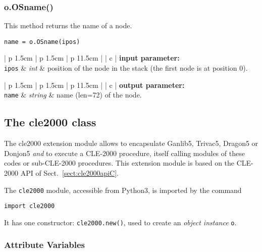 \vskip 0.8cm

\subsubsection{o.OSname()}

This method returns the name of a node.

\begin{verbatim}
name = o.OSname(ipos)
\end{verbatim}

\noindent
\begin{tabular} {| p {1.5cm} | p {1.5cm} | p {11.5cm} |}
\hline
{} {| c |} {\bf input parameter:} \\
\hline
{\tt ipos} & {\it int}  & position of the node in the stack (the first node is at position 0). \\
\hline
\end{tabular}

\vskip 0.8cm

\noindent
\begin{tabular} {| p {1.5cm} | p {1.5cm} | p {11.5cm} |}
\hline
{} {| c |} {\bf output parameter:} \\
\hline
{\tt name} & {\it string} & name (len=72) of the node.\\
\hline
\end{tabular}

\vskip 0.8cm

\subsection{The cle2000 class}

The  {\sc cle2000} extension module allows to encapsulate Ganlib5, Trivac5, Dragon5 or Donjon5 {\sl and} to execute a CLE-2000 procedure, itself calling modules of these codes or sub-CLE-2000 procedures. This extension module is based on the CLE-2000 API of Sect.~\ref{sect:cle2000apiC}. 

The {\tt cle2000} module, accessible from Python3, is imported by the command
\begin{verbatim}
import cle2000
\end{verbatim}
It has one constructor: {\tt cle2000.new()}, used to create an {\sl object instance} {\tt o}.

\subsubsection{Attribute Variables}

